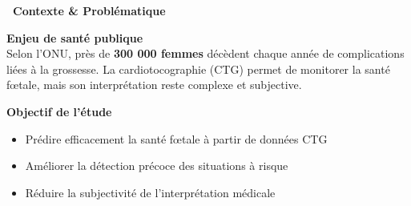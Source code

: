 \documentclass[a0,landscape]{a0poster}
\newcommand{\bigsection}[1]{
  \vspace{0.5cm}
  \begin{tcolorbox}[
    colback=primaryblue,
    coltext=white,
    arc=2mm,
    boxrule=0pt,
    left=10pt,
    right=10pt,
    top=5pt,
    bottom=5pt
  ]
    {\Large\bfseries #1\par}
  \end{tcolorbox}
  \vspace{0.3cm}
}
\newcommand{\checkitem}{\item[\textcolor{accentgreen}{\faCheck}]}
\begin{document}
\begin{multicols}{3}
\raggedcolumns

\vspace{1em}
\bigsection{\faHeartbeat\ Contexte \& Problématique}
\vspace{1em}
\begin{infobox}
\textbf{\large Enjeu de santé publique}\\[0.3cm]
Selon l'ONU, près de \textbf{300 000 femmes} décèdent chaque année de complications liées à la grossesse. La cardiotocographie (CTG) permet de monitorer la santé fœtale, mais son interprétation reste complexe et subjective.
\end{infobox}

\vspace{0.5cm}

\begin{minipage}[t]{0.5\linewidth}  %
\textbf{\color{primaryblue} Objectif de l'étude}
\begin{itemize}
  \checkitem Prédire efficacement la santé fœtale à partir de données CTG
  \checkitem Améliorer la détection précoce des situations à risque
  \checkitem Réduire la subjectivité de l'interprétation médicale
\end{itemize}


\end{minipage}
\end{multicols}
\end{document}
